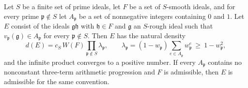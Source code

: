 \begin{lemma}\label{gpi:lem:product}
Let $S$ be a finite set of prime ideals, let $F$ be a set of $S$-smooth ideals, and for every
prime $\mathfrak p\notin S$ let $A_{\mathfrak p}$ be a set of nonnegative integers containing
$0$ and $1$. Let $E$ consist of the ideals $\mathfrak g\mathfrak h$ with $\mathfrak h\in F$
and $\mathfrak g$ an $S$-rough ideal such that $v_{\mathfrak p}(\mathfrak g)\in A_{\mathfrak p}$
for every $\mathfrak p\notin S$. Then $E$ has the natural density
\begin{equation}\label{gpi:eq:product}
 d(E)=c_S\,W(F)\prod_{\mathfrak p\notin S}\lambda_{\mathfrak p},\qquad
 \lambda_{\mathfrak p}=(1-w_{\mathfrak p})\sum_{e\in A_{\mathfrak p}}w_{\mathfrak p}^{e}
 \ \ge\ 1-w_{\mathfrak p}^2 ,
\end{equation}
and the infinite product converges to a positive number. If every $A_{\mathfrak p}$ contains
no nonconstant three-term arithmetic progression and $F$ is admissible, then $E$ is
admissible for the same convention.
\end{lemma}

